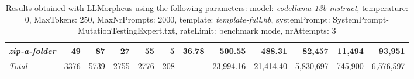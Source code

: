 \begin{table*}
{\begin{tabular}{l||r|r|r|r|r|r||r|r||r|r|r}
   \hline
   \textit{zip-a-folder} & 49 & 87 & 27 & 55 & 5 & 36.78 & 500.55 & 488.31 & 82,457 & 11,494 & 93,951 \\ 
   \hline
   \textit{Total} & 3376 & 5739 & 2755 & 2776 & 208 & - & 23,994.16  & 21,414.40 & 5,830,697 & 745,900 & 6,576,597 \\ 
 \end{tabular}
 }
 \caption{Results obtained with LLMorpheus using the following parameters: 
   model: \textit{codellama-13b-instruct}, 
   temperature: 0, 
   MaxTokens: 250, 
   MaxNrPrompts: 2000, 
   template: \textit{template-full.hb}, 
   systemPrompt: SystemPrompt-MutationTestingExpert.txt, 
   rateLimit: benchmark mode, 
   nrAttempts: 3  
 }
\end{table*}

